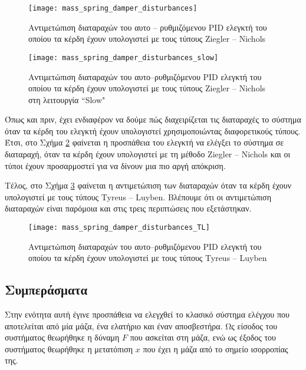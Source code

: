 \begin{figure}[h]
  \centering
  \texttt{[image: mass\_spring\_damper\_disturbances]}
  \caption{Αντιμετώπιση διαταραχών του αυτο -- ρυθμιζόμενου PID ελεγκτή του οποίου τα κέρδη έχουν υπολογιστεί με τους τύπους Ziegler -- Nichols}
  \label{fig:mass_spring_damper_disturbances}
\end{figure}

\begin{figure}[h]
  \centering
  \texttt{[image: mass\_spring\_damper\_disturbances\_slow]}
  \caption{Αντιμετώπιση διαταραχών του αυτο--ρυθμιζόμενου PID ελεγκτή του οποίου τα κέρδη έχουν υπολογιστεί με τους τύπους Ziegler -- Nichols στη λειτουργία ``Slow"}
  \label{fig:mass_spring_damper_disturbances_slow}
\end{figure}

Όπως και πριν, έχει ενδιαφέρον να δούμε πώς διαχειρίζεται τις διαταραχές το σύστημα όταν τα κέρδη του ελεγκτή έχουν υπολογιστεί χρησιμοποιώντας διαφορετικούς τύπους. Έτσι, στο Σχήμα \ref{fig:mass_spring_damper_disturbances_slow} φαίνεται η προσπάθεια του ελεγκτή να ελέγξει το σύστημα σε διαταραχή, όταν τα κέρδη έχουν υπολογιστεί με τη μέθοδο Ziegler -- Nichols και οι τύποι έχουν προσαρμοστεί για να δίνουν μια πιο αργή απόκριση.

Τέλος, στο Σχήμα \ref{fig:mass_spring_damper_disturbances_TL} φαίνεται η αντιμετώπιση των διαταραχών όταν τα κέρδη έχουν υπολογιστεί με τους τύπους Tyreus -- Luyben. Βλέπουμε ότι οι αντιμετώπιση διαταραχών είναι παρόμοια και στις τρεις περιπτώσεις που εξετάστηκαν.

\begin{figure}[h]
  \centering
  \texttt{[image: mass\_spring\_damper\_disturbances\_TL]}
  \caption{Αντιμετώπιση διαταραχών του αυτο--ρυθμιζόμενου PID ελεγκτή του οποίου τα κέρδη έχουν υπολογιστεί με τους τύπους Tyreus -- Luyben}
  \label{fig:mass_spring_damper_disturbances_TL}
\end{figure}

\subsection{Συμπεράσματα}

Στην ενότητα αυτή έγινε προσπάθεια να ελεγχθεί το κλασικό σύστημα ελέγχου που αποτελείται από μία μάζα, ένα ελατήριο και έναν αποσβεστήρα. Ως είσοδος του συστήματος θεωρήθηκε η δύναμη $F$ που ασκείται στη μάζα, ενώ ως έξοδος του συστήματος θεωρήθηκε η μετατόπιση $x$ που έχει η μάζα από το σημείο ισορροπίας της. 

